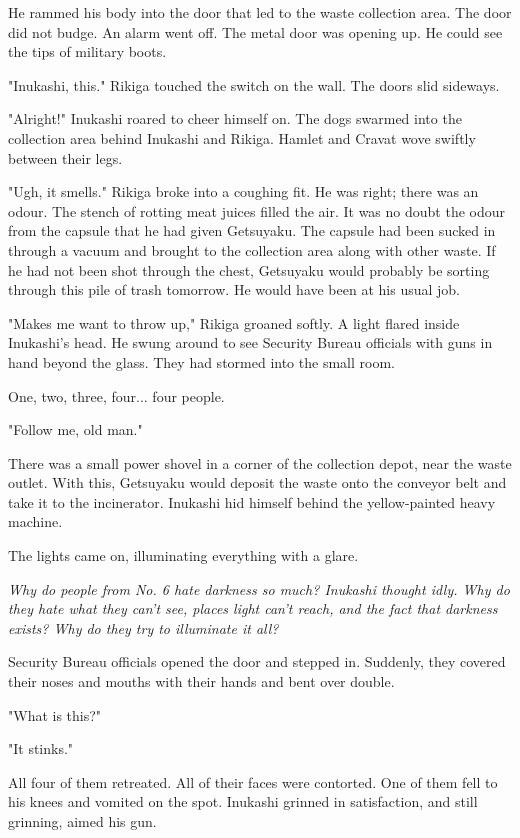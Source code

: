 He rammed his body into the door that led to the waste collection area.
The door did not budge. An alarm went off. The metal door was opening
up. He could see the tips of military boots.

"Inukashi, this." Rikiga touched the switch on the wall. The doors slid
sideways.

"Alright!" Inukashi roared to cheer himself on. The dogs swarmed into
the collection area behind Inukashi and Rikiga. Hamlet and Cravat wove
swiftly between their legs.

"Ugh, it smells." Rikiga broke into a coughing fit. He was right; there
was an odour. The stench of rotting meat juices filled the air. It was
no doubt the odour from the capsule that he had given Getsuyaku. The
capsule had been sucked in through a vacuum and brought to the
collection area along with other waste. If he had not been shot through
the chest, Getsuyaku would probably be sorting through this pile of
trash tomorrow. He would have been at his usual job.

"Makes me want to throw up," Rikiga groaned softly. A light flared
inside Inukashi's head. He swung around to see Security Bureau officials
with guns in hand beyond the glass. They had stormed into the small
room.

One, two, three, four... four people.

"Follow me, old man."

There was a small power shovel in a corner of the collection depot, near
the waste outlet. With this, Getsuyaku would deposit the waste onto the
conveyor belt and take it to the incinerator. Inukashi hid himself
behind the yellow-painted heavy machine.

The lights came on, illuminating everything with a glare.

\emph{Why do people from No. 6 hate darkness so much? Inukashi thought idly.
Why do they hate what they can't see, places light can't reach, and the
fact that darkness exists? Why do they try to illuminate it all?}

Security Bureau officials opened the door and stepped in. Suddenly, they
covered their noses and mouths with their hands and bent over double.

"What is this?"

"It stinks."

All four of them retreated. All of their faces were contorted. One of
them fell to his knees and vomited on the spot. Inukashi grinned in
satisfaction, and still grinning, aimed his gun.

